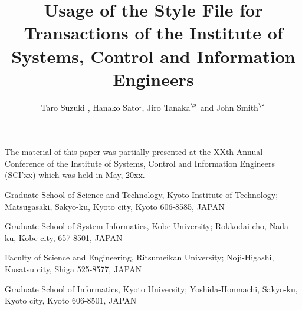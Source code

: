 \documentclass[E]{scitrans}
\begin{document}
\title{Usage of the Style File for Transactions of the Institute of
        Systems, Control and Information Engineers}

\author{Taro {\sc Suzuki}${}^\dagger$, Hanako {\sc Sato}${}^\ddagger$,
Jiro {\sc Tanaka}${}^\S$ and John {\sc Smith}${}^\P$}



\maketitle
{}
\address{*}{\AcceptDate}

\address{*}{The material of this paper was partially presented at the XXth Annual Conference of the Institute of Systems, Control and Information Engineers (SCI'xx) which was held in May, 20xx.}


\address{**}{Graduate School of Science and Technology,
        Kyoto Institute of Technology;
        Matsugasaki, Sakyo-ku, Kyoto city, Kyoto 606-8585, JAPAN}
\address{***}{Graduate School of System Informatics,
        Kobe University;
        Rokkodai-cho, Nada-ku, Kobe city, 657-8501, JAPAN}
\address{****}{Faculty of Science and Engineering,
        Ritsumeikan University;
        Noji-Higashi, Kusatsu city, Shiga 525-8577, JAPAN}
\address{*****}{Graduate School of Informatics,
        Kyoto University;
        Yoshida-Honmachi, Sakyo-ku, Kyoto city, Kyoto 606-8501, JAPAN}



\end{document}
